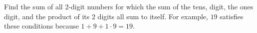 Find the sum of all 2-digit numbers for which the sum of the tens, digit, the ones digit, and the product of its $2$ digits all sum to itself. For example, $19$ satisfies these conditions because $1+9+1\cdot 9=19$.
